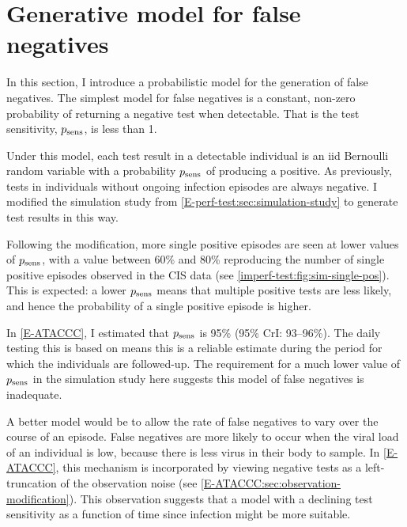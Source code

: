 \documentclass[thesis.tex]{subfiles}
\begin{document}
\section{Generative model for false negatives} \label{imperf-test:sec:simulate}

In this section, I introduce a probabilistic model for the generation of false negatives.
The simplest model for false negatives is a constant, non-zero probability of returning a negative test when detectable.
That is the test sensitivity, $p_\text{sens}$, is less than 1.

Under this model, each test result in a detectable individual is an iid Bernoulli random variable with a probability $p_\text{sens}$ of producing a positive.
As previously, tests in individuals without ongoing infection episodes are always negative.
I modified the simulation study from \cref{E-perf-test:sec:simulation-study} to generate test results in this way.

Following the modification, more single positive episodes are seen at lower values of $p_\text{sens}$, with a value between 60\% and 80\% reproducing the number of single positive episodes observed in the CIS data (see \cref{imperf-test:fig:sim-single-pos}).
This is expected: a lower $p_\text{sens}$ means that multiple positive tests are less likely, and hence the probability of a single positive episode is higher.

In \cref{E-ATACCC}, I estimated that $p_\text{sens}$ is 95\% (95\% CrI: 93--96\%).
The daily testing this is based on means this is a reliable estimate during the period for which the individuals are followed-up.
The requirement for a much lower value of $p_\text{sens}$ in the simulation study here suggests this model of false negatives is inadequate.

A better model would be to allow the rate of false negatives to vary over the course of an episode.
False negatives are more likely to occur when the viral load of an individual is low, because there is less virus in their body to sample.
In \cref{E-ATACCC}, this mechanism is incorporated by viewing negative tests as a left-truncation of the observation noise (see \cref{E-ATACCC:sec:observation-modification}).
This observation suggests that a model with a declining test sensitivity as a function of time since infection might be more suitable.
\end{document}
